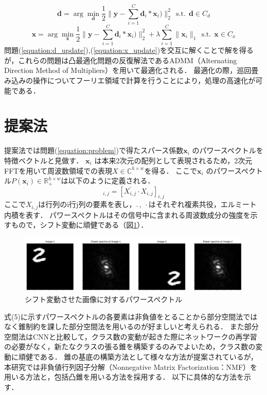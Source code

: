 \documentclass[9pt,a4paper,twocolumn,uplatex]{jsarticle}
\begin{document}
\begin{equation}
\label{equation:d_update}
\bm d=\arg\min_{\bm d}\frac{1}{2}\|\bm y-\sum_{i=1}^{C}\bm d_i*\bm x_i)\|_2^2~~\text{s.t.}~~\bm d\in C_d
\end{equation}
\begin{equation}
\label{equation:x_update}
\bm x=\arg\min_{\bm x}\frac{1}{2}\|\bm y-\sum_{i=1}^{C}\bm d_i*\bm x_i)\|_2^2+\lambda\sum_{i=1}^{C}\|\bm x_i\|_1~~\text{s.t.}~~\bm x\in C_x
\end{equation}
問題(\ref{equation:d_update}),(\ref{equation:x_update})を交互に解くことで解を得るが，これらの問題は凸最適化問題の反復解法であるADMM（Alternating  Direction  Method  of  Multipliers）\cite{admm}を用いて最適化される．
最適化の際，巡回畳み込みの操作についてフーリエ領域で計算を行うことにより，処理の高速化が可能である\cite{csc}．

\section{提案法}
提案法では問題(\ref{equation:problem})で得たスパース係数$\bm x_i$ のパワースペクトルを特徴ベクトルと見做す．
$\bm x_i$ は本来2次元の配列として表現されるため，2次元FFTを用いて周波数領域での表現$X\in\mathbb C^{h\times w}$を得る．
ここで$\bm x_i$ のパワースペクトル$P(\bm x_i)\in\mathbb R_+^{h\times w}$は以下のように定義される．
\begin{equation}
[P(\bm x_i)]_{i,j}=[\bar{X_{i,j}}\cdot X_{i,j}]_{i,j}
\end{equation}
ここで$X_{i,j}$は行列のi行j列の要素を表し，$\bar{}~,~\cdot$はそれぞれ複素共役，エルミート内積を表す．
パワースペクトルはその信号中に含まれる周波数成分の強度を示すもので，シフト変動に頑健である（図\ref{fig:spectra}）．
\vspace{-1.5mm}
\begin{figure}[htb]
	\centering
	\includegraphics[width=\linewidth]{spectra.png}
	\caption{シフト変動させた画像に対するパワースペクトル}
	\label{fig:spectra}
\end{figure}
式(5)に示すパワースペクトルの各要素は非負値をとることから部分空間法ではなく錐制約を課した部分空間法を用いるのが好ましいと考えられる．
また部分空間法はCNNと比較して，クラス数の変動が起きた際にネットワークの再学習の必要がなく，新たなクラスの張る錐を構築するのみでよいため，クラス数の変動に頑健である．
錐の基底の構築方法として様々な方法が提案されている\cite{cones}が，本研究では非負値行列因子分解（Nonnegative Matrix Factorization：NMF）\cite{nmf}を用いる方法と，包括凸錐を用いる方法を採用する．
以下に具体的な方法を示す．
\end{document}
